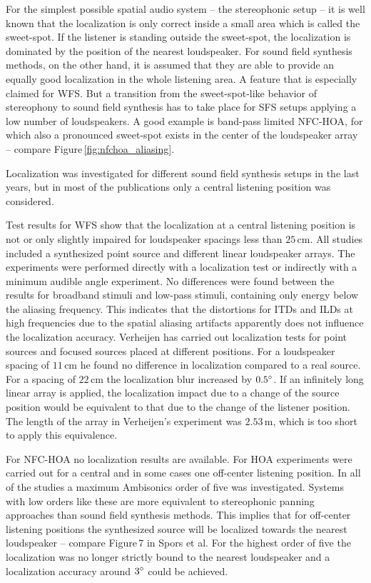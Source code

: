 For the simplest possible spatial audio system -- the stereophonic setup -- it is
well known that the localization is only correct inside a small area which is
called the sweet-spot. If the listener is standing outside the sweet-spot, the
localization is dominated by the position of the nearest loudspeaker.
For sound field synthesis methods, on the other hand, it is assumed that they are
able to provide an equally good localization in the whole listening area. A
feature that is especially claimed for \ac{WFS}.
But a transition from the sweet-spot-like behavior of stereophony to
sound field synthesis has to take place for \ac{SFS} setups applying a low
number of loudspeakers. A good
example is band-pass limited \ac{NFC-HOA}, for which also a pronounced sweet-spot
exists in the center of the loudspeaker array -- compare
Figure\,\ref{fig:nfchoa_aliasing}.

Localization was investigated for different sound field synthesis setups in the
last years, but in most of the publications only a central
listening position was considered.

Test results for \ac{WFS} show that the
localization
at a central listening position is not or only slightly impaired
for loudspeaker spacings less than
$25$\,cm.\autocite{Vogel1993,Start1997,Wittek2007}
All studies included a synthesized point source and different linear
loudspeaker arrays.
The experiments were performed directly with a localization test or indirectly with a
minimum audible angle experiment\autocite{Vogel1993}. No differences were found
between the results for
broadband stimuli and low-pass stimuli, containing only energy below the
aliasing frequency. This indicates that the distortions for
\acp{ITD} and \acp{ILD} at high frequencies due to the spatial aliasing artifacts
apparently does not influence the localization accuracy.
Verheijen has carried out localization tests for point sources and focused sources
placed at different positions.\autocite{Verheijen1997}
For a loudspeaker spacing of $11$\,cm he found no difference in localization 
compared to a real source. For a spacing of $22$\,cm the localization blur
increased by $0.5^\circ$.
If an infinitely long linear array is applied, the localization impact due to a
change of the source position would be equivalent to that due to the change of the listener
position. The length of the array in Verheijen's experiment was $2.53$\,m, which
is too short to apply this equivalence.

For \ac{NFC-HOA} no localization results are available. For \ac{HOA} experiments
were carried out for a central and in some cases one off-center listening
position.\autocite[E.g.][]{Bertet2013}
In all of the studies a maximum Ambisonics order of five was investigated.
Systems with low orders like these are more
equivalent to stereophonic panning approaches than sound field synthesis
methods. This implies that for off-center listening positions the synthesized
source will be localized towards the nearest loudspeaker -- compare Figure\,7 in
Spors et al.\autocite{Spors2013a}
For the highest order of five the localization was no longer strictly bound
to the nearest loudspeaker and a localization accuracy around
$3^\circ$ could be achieved.\autocite{Frank2008}

